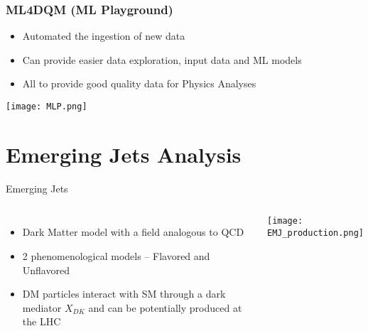\documentclass[aspectratio=1610]{beamer}
\begin{document}
\begin{frame}
	\frametitle{ML4DQM (ML Playground)}
	\begin{itemize}
		\item Automated the ingestion of new data
		\item Can provide easier data exploration, input data and ML models
		\item All to provide good quality data for Physics Analyses
	\end{itemize}
	\texttt{[image: MLP.png]}
\end{frame}

\section{Emerging Jets Analysis}

\begin{frame}{Emerging Jets}
	\begin{columns}
		\begin{itemize}
			\item Dark Matter model with a field analogous to QCD
			\item 2 phenomenological models -- Flavored and Unflavored
			\item DM particles interact with SM through a dark mediator $X_{DK}$ and can be potentially produced at the LHC
		\end{itemize}
		\texttt{[image: EMJ\_production.png]}
	\end{columns}
\end{frame}
\end{document}
